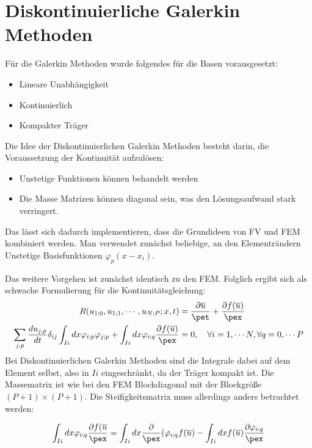 \section{Diskontinuierliche Galerkin Methoden}
F\"ur die Galerkin Methoden wurde folgendes f\"ur die Basen vorausgesetzt:
\begin{itemize}
	\item Lineare Unabh\"angigkeit
	\item Kontinuierlich
	\item Kompakter Tr\"ager
\end{itemize}
Die Idee der Diskontinuierlichen Galerkin Methoden besteht darin, die Voraussetzung der Kontinuit\"at aufzul\"osen:
\begin{itemize}
	\item Unstetige Funktionen k\"onnen behandelt werden
	\item Die Masse Matrizen k\"onnen diagonal sein, was den L\"osungsaufwand stark verringert.
\end{itemize}
Das l\"asst sich dadurch implementieren, dass die Grundideen von FV und FEM kombiniert werden. Man verwendet zun\"achst beliebige, an den Elementr\"andern Unstetige Basisfunktionen $\varphi_p(x-x_i)$.
\par
Das weitere Vorgehen ist zun\"achst identisch zu den FEM. Folglich ergibt sich als schwache Formulierung f\"ur die Kontinuit\"atsgleichung:
\begin{align*}
	R(u_{1;0},u_{1;1},\cdots,u_{N;P};x,t) &= \frac{\partial \overline{u}}{\pet} + \frac{\partial f(\overline{u})}{\pex} \\
	\sum_{j,p}\frac{du_{j,p}}{dt}\delta_{ij}\int_{Ii}dx\varphi_{i;p}\varphi_{j;p} + \int_{Ii}dx\varphi_{i;q}\frac{\partial f(\overline{u})}{\pex} &= 0,~~~\forall i=1,\cdots N,\forall q=0,\cdots P
\end{align*}
Bei Diskontinuierlichen Galerkin Methoden sind die Integrale dabei auf dem Element selbst, also in $Ii$ eingeschr\"ankt, da der Tr\"ager kompakt ist. Die Massematrix ist wie bei den FEM Blockdiagonal mit der Blockgr\"o\ss{}e $(P+1)\times(P+1)$. Die Steifigkeitsmatrix muss allerdings anders betrachtet werden:
\par
\begin{equation*}
	\int_{Ii}dx\varphi_{i;q}\frac{\partial f(\overline{u}}{\pex} = \int_{Ii}dx\frac{\partial}{\pex}(\varphi_{i;q}f(\overline{u}) - \int_{Ii}dxf(\overline{u})\frac{\partial\varphi_{i;q}}{\pex}
\end{equation*}
\par
\vspace{-2em}

